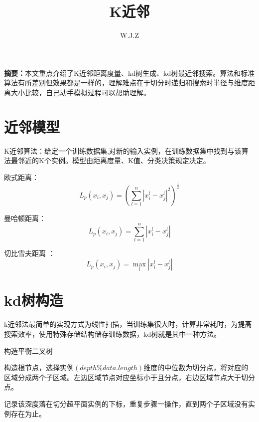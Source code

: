 \documentclass{article}
\title{K近邻}
\author{W.J.Z}
\date{}
\begin{document}
	\maketitle
	\textbf{摘要：}本文重点介绍了K近邻距离度量、kd树生成、kd树最近邻搜索。算法和标准算法有所差别但效果都是一样的，理解难点在于切分时递归和搜索时半径与维度距离大小比较，自己动手模拟过程可以帮助理解。
	\section{近邻模型}
	K近邻算法：给定一个训练数据集,对新的输入实例，在训练数据集中找到与该算法最邻近的K个实例。模型由距离度量、K值、分类决策规定决定。
	
	\noindent 欧式距离：
	\begin{equation}
	L_{p}\left ( x_{i},x_{j} \right )=\left ( \sum_{l=1}^{n}\left | x_{i}^{l}-x_{j}^{l} \right |^{2} \right )^{\frac{1}{2}}
	\end{equation}
	
	\noindent 曼哈顿距离：
	\begin{equation}
	L_{p}\left ( x_{i},x_{j} \right )= \sum_{l=1}^{n}\left | x_{i}^{l}-x_{j}^{l} \right | 
	\end{equation}
	
	\noindent  切比雪夫距离 ：
	\begin{equation}
	L_{p}\left ( x_{i},x_{j} \right )= \max\limits_{l}\left |x_{i}^{l}-x_{j}^{l}  \right |
	\end{equation}
	\section{kd树构造}
	k近邻法最简单的实现方式为线性扫描，当训练集很大时，计算非常耗时，为提高搜索效率，使用特殊存储结构储存训练数据，kd树就是其中一种方法。
	
	\begin{algorithm}[H]
		\caption{构造平衡二叉树}
		\LinesNumbered	
		构造根节点，选择实例$(depth \% data.length)$维度的中位数为切分点，将对应的区域分成两个子区域。左边区域节点对应坐标小于且分点，右边区域节点大于切分点。
		
		记录该深度落在切分超平面实例的下标，重复步骤一操作，直到两个子区域没有实例存在为止。
		
	\end{algorithm}
	
\end{document}
